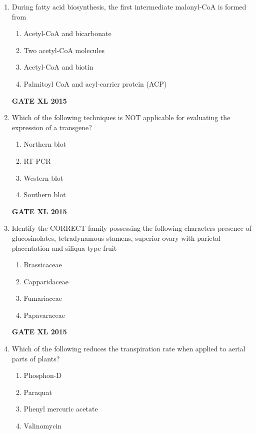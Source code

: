 \documentclass[journal,12pt,onecolumn]{IEEEtran}
\begin{document}
\begin{enumerate}
\item During fatty acid biosynthesis, the first intermediate malonyl-CoA is formed from 
    \begin{enumerate}
            \item Acetyl-CoA and bicarbonate
	    \item Two acetyl-CoA molecules
	    \item Acetyl-CoA and biotin
            \item  Palmitoyl CoA and acyl-carrier protein (ACP)
	\end{enumerate}
\begin{flushright}\textbf{GATE XL 2015}\end{flushright}
\item  Which of the following techniques is NOT applicable for evaluating the expression of a transgene?
        \begin{enumerate} 
            \item Northern blot
	    \item RT-PCR
	    \item Western blot
            \item Southern blot
	\end{enumerate}
\begin{flushright}\textbf{GATE XL 2015}\end{flushright}
\item Identify the CORRECT family possessing the following characters presence of glucosinolates, tetradynamous stamens, superior ovary with parietal placentation and siliqua type fruit
        \begin{enumerate} 
            \item Brassicaceae
	    \item Capparidaceae
	    \item Fumariaceae
            \item Papavaraceae
    \end{enumerate}
\begin{flushright}\textbf{GATE XL 2015}\end{flushright}
\item Which of the following reduces the transpiration rate when applied to aerial parts of plants?
    \begin{enumerate}
            \item Phosphon-D
	    \item Paraquat
	    \item Phenyl mercuric acetate
            \item Valinomycin

\end{enumerate}
\end{enumerate}
\end{document}
